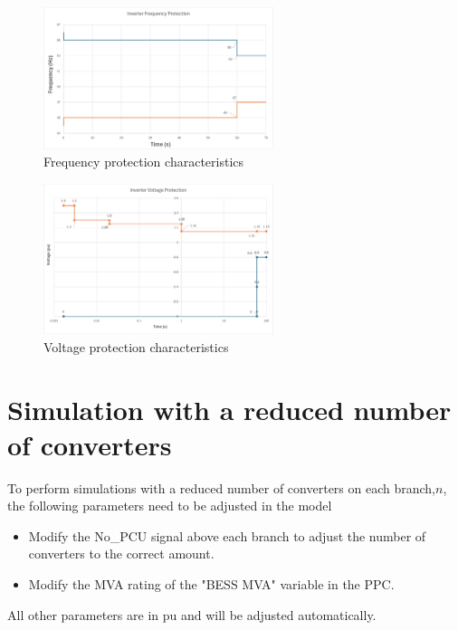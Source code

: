 \documentclass{../grid-link-report}
\begin{document}
		\begin{figure}[H]
			\centering
			\includegraphics[width=0.6\textwidth]{report-assets/images/fprotection.png}
			\caption{Frequency protection characteristics}
			\label{fig:fprotection}
		\end{figure}
		
		\begin{figure}[H]
			\centering
			\includegraphics[width=0.6\textwidth]{report-assets/images/vprotection-new.png}
			\caption{Voltage protection characteristics}
			\label{fig:vprotection}
		\end{figure}
		
		\section{Simulation with a reduced number of converters}
		
		To perform simulations with a reduced number of converters on each branch,$n$, the following parameters need to be adjusted in the model
		
		\begin{itemize}
			\item Modify the No\_PCU signal above each branch to adjust the number of converters to the correct amount.
			\item Modify the MVA rating of the "BESS MVA" variable in the PPC.
			
		\end{itemize}
		
		All other parameters are in pu and will be adjusted automatically.
	
\end{document}
